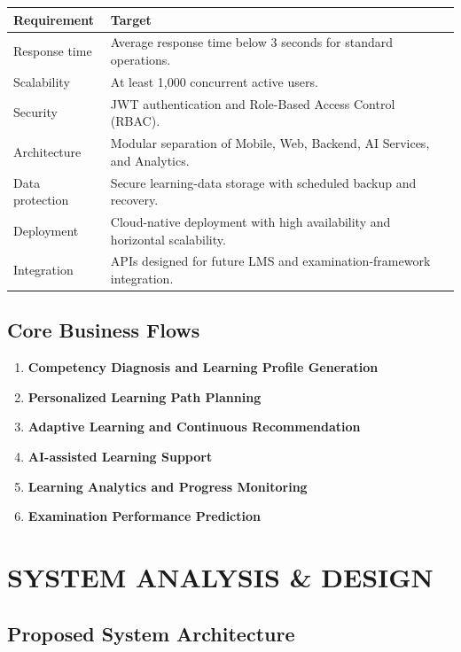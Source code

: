 \documentclass[12pt,a4paper]{report}
\begin{document}
\begin{longtable}{p{}p{}}
\toprule
\textbf{Requirement} & \textbf{Target}\\
\midrule
Response time & Average response time below 3 seconds for standard operations.\\
Scalability & At least 1,000 concurrent active users.\\
Security & JWT authentication and Role-Based Access Control (RBAC).\\
Architecture & Modular separation of Mobile, Web, Backend, AI Services, and Analytics.\\
Data protection & Secure learning-data storage with scheduled backup and recovery.\\
Deployment & Cloud-native deployment with high availability and horizontal scalability.\\
Integration & APIs designed for future LMS and examination-framework integration.\\
\bottomrule
\end{longtable}

\section{Core Business Flows}

\begin{enumerate}
    \item \textbf{Competency Diagnosis and Learning Profile Generation}
    \item \textbf{Personalized Learning Path Planning}
    \item \textbf{Adaptive Learning and Continuous Recommendation}
    \item \textbf{AI-assisted Learning Support}
    \item \textbf{Learning Analytics and Progress Monitoring}
    \item \textbf{Examination Performance Prediction}
\end{enumerate}

\chapter{SYSTEM ANALYSIS \& DESIGN}

\section{Proposed System Architecture}
\end{document}
